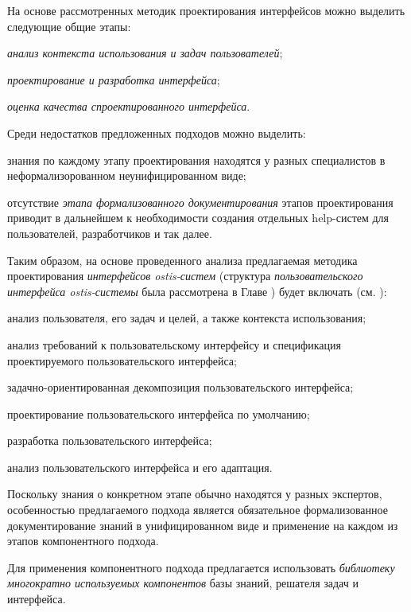 На основе рассмотренных методик проектирования интерфейсов можно выделить следующие общие этапы:
\begin{textitemize}
\item \textit{анализ контекста использования и задач пользователей};
\item \textit{проектирование и разработка интерфейса};
\item \textit{оценка качества спроектированного интерфейса}.
\end{textitemize}

Среди недостатков предложенных подходов можно выделить:
\begin{textitemize}
	\item знания по каждому этапу проектирования находятся у разных специалистов в неформализорованном неунифицированном виде;
	\item отсутствие \textit{этапа формализованного документирования} этапов проектирования приводит в дальнейшем к необходимости создания отдельных help-систем для пользователей, разработчиков и так далее.
\end{textitemize}

Таким образом, на основе проведенного анализа предлагаемая методика проектирования \textit{интерфейсов ostis-систем} (структура \textit{пользовательского интерфейса ostis-системы} была рассмотрена в Главе ) будет включать (см. ):
\begin{textitemize}
\item анализ пользователя, его задач и целей, а также контекста использования;
\item анализ требований к пользовательскому интерфейсу и спецификация проектируемого пользовательского интерфейса;
\item задачно-ориентированная декомпозиция пользовательского интерфейса;
\item проектирование пользовательского интерфейса по умолчанию;
\item разработка пользовательского интерфейса;
\item анализ пользовательского интерфейса и его адаптация.
\end{textitemize}

Поскольку знания о конкретном этапе обычно находятся у разных экспертов, особенностью предлагаемого подхода является обязательное формализованное документирование знаний в унифицированном виде и применение на каждом из этапов компонентного подхода.

Для применения компонентного подхода предлагается использовать \textit{библиотеку многократно используемых компонентов} базы знаний, решателя задач и интерфейса.

